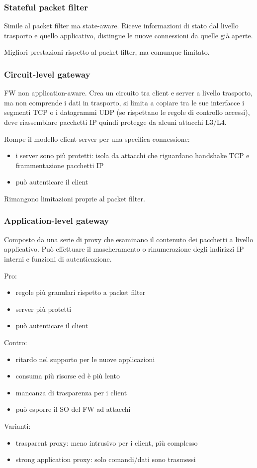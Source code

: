\documentclass[11pt]{article}
\begin{document}
\subsubsection{Stateful packet filter}
Simile al packet filter ma state-aware.  Riceve informazioni di stato dal livello trasporto e quello applicativo, distingue 
le nuove connessioni da quelle già aperte.

Migliori prestazioni rispetto al packet filter, ma comunque limitato.
\subsubsection{Circuit-level gateway}
FW non application-aware. Crea un circuito tra client e server a livello trasporto, ma non comprende i dati in trasporto,
si limita a copiare tra le sue interfacce i segmenti TCP o i datagrammi UDP (se rispettano le regole di controllo accessi),
deve riassemblare pacchetti IP quindi protegge da alcuni attacchi L3/L4.

Rompe il modello client server per una specifica connessione:
\begin{itemize}
    \item i server sono più protetti: isola da attacchi che riguardano handshake TCP e frammentazione pacchetti IP 
    \item può autenticare il client 
\end{itemize}
Rimangono limitazioni proprie al packet filter.
\subsubsection{Application-level gateway}
Composto da una serie di proxy che esaminano il contenuto dei pacchetti a livello applicativo. Può effettuare il mascheramento 
o rinumerazione degli indirizzi IP interni e funzioni di autenticazione. 

Pro:
\begin{itemize}
    \item regole più granulari rispetto a packet filter 
    \item server più protetti 
    \item può autenticare il client 
\end{itemize}
Contro:
\begin{itemize}
    \item ritardo nel supporto per le nuove applicazioni
    \item consuma più risorse ed è più lento 
    \item mancanza di trasparenza per i client 
    \item può esporre il SO del FW ad attacchi 
\end{itemize}
Varianti: 
\begin{itemize}
    \item trasparent proxy: meno intrusivo per i client, più complesso 
    \item strong application proxy: solo comandi/dati sono trasmessi
\end{itemize}
\end{document}
